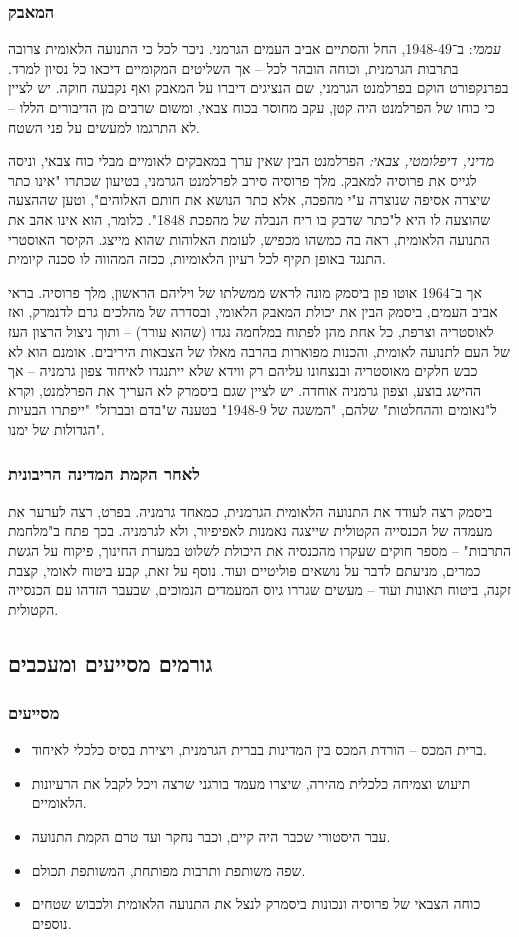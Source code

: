 \documentclass[a4paper]{book}
\begin{document}
	\subsubsection{המאבק}
	\textit{עממי}: ב־1948-49, החל והסתיים אביב העמים הגרמני. ניכר לכל כי התנועה הלאומית צרובה בתרבות הגרמנית, וכוחה הובהר לכל – אך השליטים המקומיים דיכאו כל נסיון למרד. בפרנקפורט הוקם בפרלמנט הגרמני, שם הנציגים דיברו על המאבק ואף נקבעה חוקה. יש לציין כי כוחו של הפרלמנט היה קטן, עקב מחוסר בכוח צבאי, ומשום שרבים מן הדיבורים הללו – לא התרגמו למעשים על פני השטח. 
	
	\textit{מדיני, דיפלומטי, צבאי: }הפרלמנט הבין שאין ערך במאבקים לאומיים מבלי כוח צבאי, וניסה לגייס את פרוסיה למאבק. מלך פרוסיה סירב לפרלמנט הגרמני, בטיעון שכתרו "אינו כתר שיצרה אסיפה שנוצרה ע"י מהפכה, אלא כתר הנושא את חותם האלוהים", וטען שההצעה שהוצעה לו היא ל"כתר שדבק בו ריח הנבלה של מהפכת 1848". כלומר, הוא אינו אהב את התנועה הלאומית, ראה בה כמשהו מכפיש, לעומת האלוהות שהוא מייצג. הקיסר האוסטרי התנגד באופן תקיף לכל רעיון הלאומיות, ככזה המהווה לו סכנה קיומית. 
	
	אך ב־1964 אוטו פון ביסמק מונה לראש ממשלתו של ויליהם הראשון, מלך פרוסיה. בראי אביב העמים, ביסמק הבין את יכולת המאבק הלאומי, ובסדרה של מהלכים גרם לדנמרק, ואז לאוסטריה וצרפת, כל אחת מהן לפתוח במלחמה נגדו (שהוא עורר) – ותוך ניצול הרצון העז של העם לתנועה לאומית, והכנות מפוארות בהרבה מאלו של הצבאות היריבים. אומנם הוא לא כבש חלקים מאוסטריה ובנצחונו עליהם רק ווידא שלא ייתנגדו לאיחוד צפון גרמניה – אך ההישג בוצע, וצפון גרמניה אוחדה. יש לציין שגם ביסמרק לא העריך את הפרלמנט, וקרא ל"נאומים וההחלטות" שלהם, "המשגה של 1948-9" בטענה ש"בדם ובברזל" "ייפתרו הבעיות הגדולות של ימנו". 
	\subsubsection{לאחר הקמת המדינה הריבונית}
	ביסמק רצה לעודד את התנועה הלאומית הגרמנית, כמאחד גרמניה. בפרט, רצה לערער את מעמדה של הכנסייה הקטולית שייצגה נאמנות לאפיפיור, ולא לגרמניה. בכך פתח ב"מלחמת התרבות" – מספר חוקים שעקרו מהכנסיה את היכולת לשלוט במערת החינוך, פיקוח על הגשת כמרים, מניעתם לדבר על נושאים פוליטיים ועוד. נוסף על זאת, קבע ביטוח לאומי, קצבת זקנה, ביטוח תאונות ועוד – מעשים שגררו גיוס המעמדים הנמוכים, שבעבר הזדהו עם הכנסייה הקטולית. 
	
	\subsection{גורמים מסייעים ומעכבים}
	\subsubsection{מסייעים}
	\begin{itemize}
		\item ברית המכס – הורדת המכס בין המדינות בברית הגרמנית, ויצירת בסיס כלכלי לאיחוד. 
		\item תיעוש וצמיחה כלכלית מהירה, שיצרו מעמד בורגני שרצה ויכל לקבל את הרעיונות הלאומיים. 
		\item עבר היסטורי שכבר היה קיים, וכבר נחקר ועד טרם הקמת התנועה. 
		\item שפה משותפת ותרבות מפותחת, המשותפת תכולם. 
		\item כוחה הצבאי של פרוסיה ונכונות ביסמרק לנצל את התנועה הלאומית ולכבוש שטחים נוספים. 
	\end{itemize}
\end{document}
